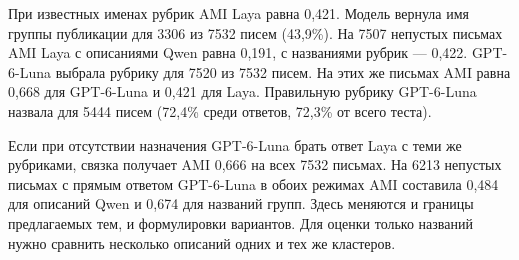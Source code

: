 При известных именах рубрик AMI Laya равна 0,421. Модель вернула имя группы публикации для 3306 из 7532 писем (43,9\%). На 7507 непустых письмах AMI Laya с описаниями Qwen равна 0,191, с названиями рубрик --- 0,422. GPT-6-Luna выбрала рубрику для 7520 из 7532 писем. На этих же письмах AMI равна 0,668 для GPT-6-Luna и 0,421 для Laya. Правильную рубрику GPT-6-Luna назвала для 5444 писем (72,4\% среди ответов, 72,3\% от всего теста).

Если при отсутствии назначения GPT-6-Luna брать ответ Laya с теми же рубриками, связка получает AMI 0,666 на всех 7532 письмах. На 6213 непустых письмах с прямым ответом GPT-6-Luna в обоих режимах AMI составила 0,484 для описаний Qwen и 0,674 для названий групп. Здесь меняются и границы предлагаемых тем, и формулировки вариантов. Для оценки только названий нужно сравнить несколько описаний одних и тех же кластеров.
